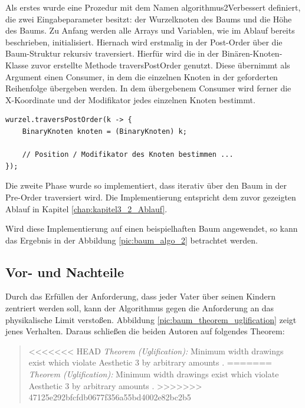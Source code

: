 Als erstes wurde eine Prozedur mit dem Namen \glqq algorithmus2Verbessert\grqq{} 
definiert, die zwei Eingabeparameter besitzt: der Wurzelknoten des Baums 
und die Höhe des Baums. Zu Anfang werden alle Arrays und Variablen, wie im Ablauf 
bereits beschrieben, initialisiert. Hiernach wird erstmalig in der Post-Order über 
die Baum-Struktur rekursiv traversiert. Hierfür wird die in der Binären-Knoten-Klasse 
zuvor erstellte Methode \glqq traversPostOrder\grqq{} genutzt. Diese übernimmt als Argument einen Consumer, 
in dem die einzelnen Knoten in der geforderten Reihenfolge übergeben werden. In dem übergebenem Consumer 
wird ferner die X-Koordinate und der Modifikator jedes einzelnen Knoten bestimmt.

\begin{lstlisting}[caption=Vereinfachte Implementierung der Phase 1, label=code:algo2_phase1]
wurzel.traversPostOrder(k -> {
    BinaryKnoten knoten = (BinaryKnoten) k;

    // Position / Modifikator des Knoten bestimmen ...
});
\end{lstlisting}

Die zweite Phase wurde so implementiert, dass iterativ über den Baum in der Pre-Order traversiert 
wird. Die Implementierung entspricht dem zuvor gezeigten Ablauf in Kapitel \ref{chap:kapitel3_2_Ablauf}. 

Wird diese Implementierung auf einen beispielhaften Baum angewendet, so kann das Ergebnis
in der Abbildung \ref{pic:baum_algo_2} betrachtet werden.

\subsection{Vor- und Nachteile}
Durch das Erfüllen der Anforderung, dass jeder Vater über seinen Kindern zentriert werden soll, kann der Algorithmus gegen
die Anforderung an das physikalische Limit verstoßen. 
Abbildung \ref{pic:baum_theorem_uglification} zeigt jenes Verhalten. Daraus schließen die beiden Autoren auf folgendes Theorem:

\begin{quotation}
<<<<<<< HEAD
	\textit{Theorem (Uglification):} Minimum width drawings exist which violate Aesthetic 3 by arbitrary amounts \cite[S.519]{q1}.
=======
	\textit{Theorem (Uglification):} Minimum width drawings exist which violate Aesthetic 3 by arbitrary amounts \cite[S. 519]{q1}.
>>>>>>> 47125e292bfcfdb0677f356a55bd4002e82bc2b5
\end{quotation}

